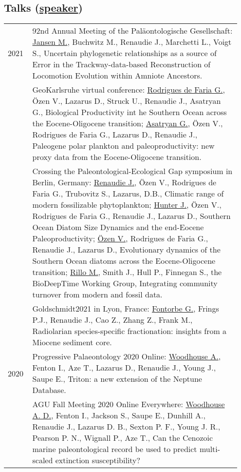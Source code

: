 \documentclass[11pt, a4paper]{article}
\begin{document}
\subsection[Talks]{Talks \textnormal{\footnotesize{(\underline{speaker})}}}
\begin{longtable}{@{}p{0.1\linewidth} P{0.85\linewidth}@{}}
2021 & 92nd Annual Meeting of the Pal\"{a}ontologische Gesellschaft: \underline{Jansen M.}, Buchwitz M., Renaudie J., Marchetti L., Voigt S., Uncertain phylogenetic relationships as a source of Error in the Trackway-data-based Reconstruction of Locomotion Evolution within Amniote Ancestors.\\
 & GeoKarlsruhe virtual conference: \underline{Rodrigues de Faria G.}, Özen V., Lazarus D., Struck U., Renaudie J., Asatryan G., Biological Productivity int he Southern Ocean across the Eocene-Oligocene transition; \underline{Asatryan G.}, Özen V., Rodrigues de Faria G., Lazarus D., Renaudie J., Paleogene polar plankton and paleoproductivity: new proxy data from the Eocene-Oligocene transition.\\
 & Crossing the Paleontological-Ecological Gap symposium in Berlin, Germany: \underline{Renaudie J.}, Özen V., Rodrigues de Faria G., Trubovitz S., Lazarus, D.B., Climatic range of modern fossilizable phytoplankton; \underline{Hunter J.}, Özen V., Rodrigues de Faria G., Renaudie J., Lazarus D., Southern Ocean Diatom Size Dynamics and the end-Eocene Paleoproductivity; \underline{Özen V.}, Rodrigues de Faria G., Renaudie J., Lazarus D., Evolutionary dynamics of the Southern Ocean diatoms across the Eocene-Oligocene transition; \underline{Rillo M.}, Smith J., Hull P., Finnegan S., the BioDeepTime Working Group, Integrating community turnover from modern and fossil data.\\
& Goldschmidt2021 in Lyon, France: \underline{Fontorbe G.}, Frings P.J., Renaudie J., Cao Z., Zhang Z., Frank M., Radiolarian species-specific fractionation: insights from a Miocene sediment core.\\
2020 & Progressive Palaeontology 2020 Online: \underline{Woodhouse A.}, Fenton I., Aze T., Lazarus D., Renaudie J., Young J., Saupe E., Triton: a new extension of the Neptune Database.\\
 & AGU Fall Meeting 2020 Online Everywhere: \underline{Woodhouse A. D.}, Fenton I., Jackson S., Saupe E., Dunhill A., Renaudie J., Lazarus D. B., Sexton P. F., Young J. R., Pearson P. N., Wignall P., Aze T., Can the Cenozoic marine paleontological record be used to predict multi-scaled extinction susceptibility? \\

\end{longtable}
\end{document}
